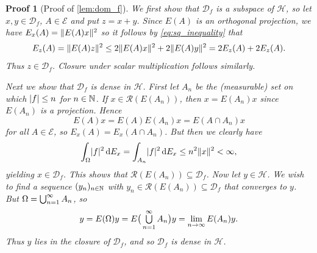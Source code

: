 \documentclass[article, a4paper, 11pt, oneside]{memoir}
\numberwithin{equation}{chapter}
\newcommand{\calH}{\mathcal{H}}
\newcommand{\calE}{\mathcal{E}}
\newcommand{\dom}{\mathcal{D}}
\newcommand{\range}{\mathcal{R}}
\theoremstyle{myexample}
\theoremstyle{myexample}
\theoremstyle{myexamplebreak}
\theoremstyle{myexamplebreak}
\theoremstyle{nonumberplain}
\theoremstyle{MyNonumberplain}
\newtheorem{proofof}{Proof}
\begin{document}
\begin{proofof}[Proof of \cref{lem:dom_f}]
    We first show that $\dom_f$ is a subspace of $\calH$, so let $x, y \in \dom_f$, $A \in \calE$ and put $z = x + y$. Since $E(A)$ is an orthogonal projection, we have $E_x(A) = \lVert E(A)x\rVert^2$ so it follows by \eqref{eq:sq_inequality} that
    \begin{equation*}
        E_z(A)
            = \lVert E(A)z\rVert^2
            \leq 2 \lVert E(A)x\rVert^2 + 2 \lVert E(A)y\rVert^2
            = 2 E_z(A) + 2 E_z(A).
    \end{equation*}
    Thus $z \in \dom_f$. Closure under scalar multiplication follows similarly.
    
    Next we show that $\dom_f$ is dense in $\calH$. First let $A_n$ be the (measurable) set on which $\lvert f\rvert \leq n$ for $n \in \mathbb{N}$. If $x \in \range(E(A_n))$, then $x = E(A_n)x$ since $E(A_n)$ is a projection. Hence
    \begin{equation*}
        E(A)x = E(A) E(A_n) x = E(A \cap A_n) x
    \end{equation*}
    for all $A \in \calE$, so $E_x(A) = E_x(A \cap A_n)$. But then we clearly have
    \begin{equation*}
        \int_\Omega \lvert f\rvert^2 \mathop{}\!\mathrm{d} E_x
            = \int_{A_n} \lvert f\rvert^2 \mathop{}\!\mathrm{d} E_x
            \leq n^2 \lVert x\rVert^2
            < \infty,
    \end{equation*}
    yielding $x \in \dom_f$. This shows that $\range(E(A_n)) \subseteq \dom_f$. Now let $y \in \calH$. We wish to find a sequence $(y_n)_{n \in \mathbb{N}}$ with $y_n \in \range(E(A_n)) \subseteq \dom_f$ that converges to $y$. But $\Omega = \bigunion_{n=1}^\infty A_n$, so
    \begin{equation*}
        y
            = E(\Omega) y
            = E \big( \bigunion_{n=1}^\infty A_n \big) y
            = \lim_{n \to \infty} E(A_n) y.
    \end{equation*}
    Thus $y$ lies in the closure of $\dom_f$, and so $\dom_f$ is dense in $\calH$.
\end{proofof}

\newcommand{\foo}[1]{}
\newcommand\nocomma[2]{#1}
\end{document}
